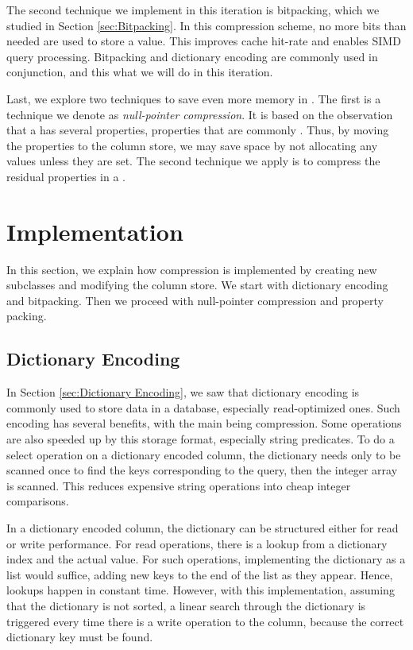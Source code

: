 The second technique we implement in this iteration is bitpacking, which we studied in Section \ref{sec:Bitpacking}. In this compression scheme, no more bits than needed are used to store a value. This improves cache hit-rate and enables SIMD query processing. Bitpacking and dictionary encoding are commonly used in conjunction, and this what we will do in this iteration.

Last, we explore two techniques to save even more memory in \gap. The first is a technique we denote as \textit{null-pointer compression}. It is based on the observation that a  has several properties, properties that are commonly \nil. Thus, by moving the properties to the column store, we may save space by not allocating any values unless they are set. The second technique we apply is to compress the residual properties in a .

\section{Implementation}
\label{sec:Implementation}
In this section, we explain how compression is implemented by creating new  subclasses and modifying the column store. We start with dictionary encoding and bitpacking. Then we proceed with null-pointer compression and property packing.

\subsection{Dictionary Encoding}
\label{sub:Dictionary Encoding}
In Section \ref{sec:Dictionary Encoding}, we saw that dictionary encoding is commonly used to store data in a database, especially read-optimized ones. Such encoding has several benefits, with the main being compression. Some operations are also speeded up by this storage format, especially string predicates. To do a select operation on a dictionary encoded column, the dictionary needs only to be scanned once to find the keys corresponding to the query, then the integer array is scanned. This reduces expensive string operations into cheap integer comparisons.

In a dictionary encoded column, the dictionary can be structured either for read or write performance. For read operations, there is a lookup from a dictionary index and the actual value. For such operations, implementing the dictionary as a list would suffice, adding new keys to the end of the list as they appear. Hence, lookups happen in constant time. However, with this implementation, assuming that the dictionary is not sorted, a linear search through the dictionary is triggered every time there is a write operation to the column, because the correct dictionary key must be found. 

